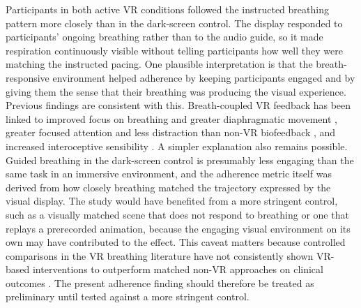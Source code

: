 \documentclass[pdflatex,sn-basic,lineno]{sn-jnl}
\begin{document}
Participants in both active VR conditions followed the instructed breathing pattern more closely than in the dark-screen control. The display responded to participants' ongoing breathing rather than to the audio guide, so it made respiration continuously visible without telling participants how well they were matching the instructed pacing. One plausible interpretation is that the breath-responsive environment helped adherence by keeping participants engaged and by giving them the sense that their breathing was producing the visual experience. Previous findings are consistent with this. Breath-coupled VR feedback has been linked to improved focus on breathing and greater diaphragmatic movement \citep{blum2020development, rockstroh2021mobile}, greater focused attention and less distraction than non-VR biofeedback \citep{rockstroh2019virtual}, and increased interoceptive sensibility \citep{GoralEtAl2024}. A simpler explanation also remains possible. Guided breathing in the dark-screen control is presumably less engaging than the same task in an immersive environment, and the adherence metric itself was derived from how closely breathing matched the trajectory expressed by the visual display. The study would have benefited from a more stringent control, such as a visually matched scene that does not respond to breathing or one that replays a prerecorded animation, because the engaging visual environment on its own may have contributed to the effect. This caveat matters because controlled comparisons in the VR breathing literature have not consistently shown VR-based interventions to outperform matched non-VR approaches on clinical outcomes \citep{CortezVazquez2024, Pancini2025}. The present adherence finding should therefore be treated as preliminary until tested against a more stringent control.
\end{document}

